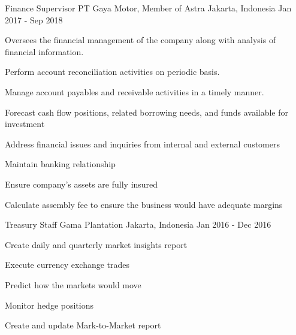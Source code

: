 \begin{cventries}
  \cventry
    {Finance Supervisor} %
    {PT Gaya Motor, Member of Astra} %
    {Jakarta, Indonesia} %
    {Jan 2017 - Sep 2018} %
    {
      \begin{cvitems} %
        \item {Oversees the financial management of the company along with analysis of financial information.}
        \item {Perform account reconciliation activities on periodic basis.}
        \item {Manage account payables and receivable activities in a timely manner.}
        \item {Forecast cash flow positions, related borrowing needs, and funds available for investment}
        \item {Address financial issues and inquiries from internal and external customers}
        \item {Maintain banking relationship}
        \item {Ensure company’s assets are fully insured}
        \item {Calculate assembly fee to ensure the business would have adequate margins}
      \end{cvitems}
    }

  \cventry
    {Treasury Staff} %
    {Gama Plantation} %
    {Jakarta, Indonesia} %
    {Jan 2016 - Dec 2016} %
    {
      \begin{cvitems} %
        \item {Create daily and quarterly market insights report}
        \item {Execute currency exchange trades}
        \item {Predict how the markets would move}
        \item {Monitor hedge positions}
        \item {Create and update Mark-to-Market report}
      \end{cvitems}
    }


\end{cventries}
